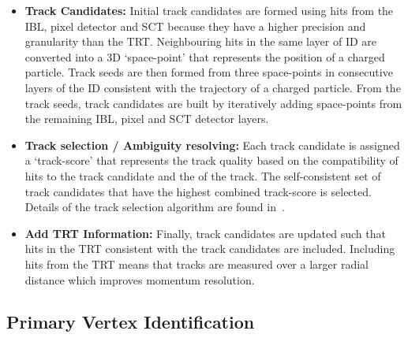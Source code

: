 \begin{itemize}[leftmargin=*]
\item\textbf{Track Candidates:}
  Initial track candidates are formed using hits from the IBL, pixel detector and SCT because they have a higher precision and granularity than the TRT.
  Neighbouring hits in the same layer of ID are converted into a 3D `space-point' that represents the position of a charged particle.
  Track seeds are then formed from three space-points in consecutive layers of the ID
  consistent with the trajectory of a charged particle. %
  From the track seeds, track candidates are built by iteratively adding space-points
  from the remaining IBL, pixel and SCT detector layers.
  \\\vspace{0.5em}
\item\textbf{Track selection / Ambiguity resolving:}
  Each track candidate is assigned a `track-score' that represents the track quality based on
  the compatibility of hits to the track candidate and the \pT{} of the track.
  The self-consistent set of track candidates that have the highest combined track-score is selected.
  Details of the track selection algorithm are found in~\cite{obj-tracks_TIDE}.\vspace{0.5em}
\item\textbf{Add TRT Information:}
  Finally, track candidates are updated such that hits in the TRT consistent with the track candidates are included.
  Including hits from the TRT means that tracks are measured over a larger radial distance which improves momentum resolution.
\end{itemize}

\subsection{Primary Vertex Identification}
\label{sec:obj-tracks_pv}

